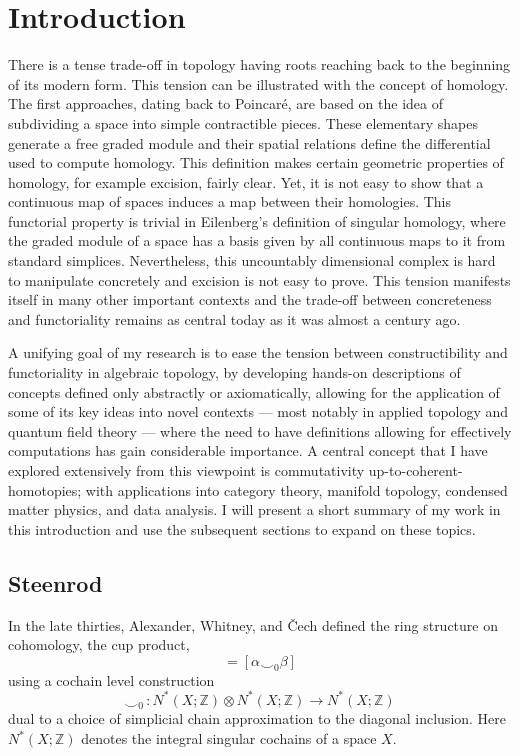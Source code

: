 
\section{Introduction} \label{s:introduction}

There is a tense trade-off in topology having roots reaching back to the beginning of its modern form.
This tension can be illustrated with the concept of homology.
The first approaches, dating back to Poincar\'e, are based on the idea of subdividing a space into simple contractible pieces.
These elementary shapes generate a free graded module and their spatial relations define the differential used to compute homology.
This definition makes certain geometric properties of homology, for example excision, fairly clear.
Yet, it is not easy to show that a continuous map of spaces induces a map between their homologies.
This functorial property is trivial in Eilenberg's definition of singular homology, where the graded module of a space has a basis given by all continuous maps to it from standard simplices.
Nevertheless, this uncountably dimensional complex is hard to manipulate concretely and excision is not easy to prove.
This tension manifests itself in many other important contexts and the trade-off between concreteness and functoriality remains as central today as it was almost a century ago.

A unifying goal of my research is to ease the tension between constructibility and functoriality in algebraic topology, by developing hands-on descriptions of concepts defined only abstractly or axiomatically, allowing for the application of some of its key ideas into novel contexts — most notably in applied topology and quantum field theory — where the need to have definitions allowing for effectively computations has gain considerable importance.
A central concept that I have explored extensively from this viewpoint is commutativity up-to-coherent-homotopies; with applications into category theory, manifold topology, condensed matter physics, and data analysis.
I will present a short summary of my work in this introduction and use the subsequent sections to expand on these topics.

\subsection{Steenrod}
In the late thirties, Alexander, Whitney, and \v{C}ech defined the ring structure on cohomology, the cup product,
\begin{equation*}
[\alpha] [\beta] = [\alpha \smallsmile_{0} \beta]
\end{equation*}
using a cochain level construction
\begin{equation*}
\smallsmile_0 \, : N^*(X; \mathbb Z) \otimes N^*(X; \mathbb Z) \to N^*(X; \mathbb Z)
\end{equation*}
dual to a choice of simplicial chain approximation to the diagonal inclusion.
Here $N^*(X; \mathbb Z)$ denotes the integral singular cochains of a space $X$.

